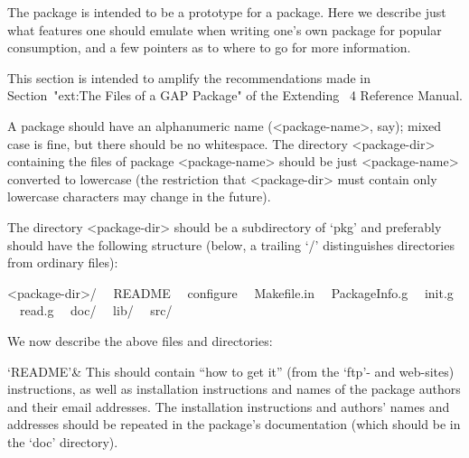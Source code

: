 

The {\Example} package is intended to be a prototype for a package.  Here
we describe just what features one should emulate when writing one's  own
{\GAP} package for popular consumption, and a few pointers as to where to
go for more information.


This  section  is  intended  to  amplify  the  recommendations  made   in
Section~"ext:The Files of  a  GAP  Package"  of  the  Extending  {\GAP}~4
Reference Manual.

A {\GAP} package should have an alphanumeric name (<package-name>,  say);
mixed case is fine, but there should  be  no  whitespace.  The  directory
<package-dir> containing the files of package  <package-name>  should  be
just  <package-name>  converted  to  lowercase  (the   restriction   that
<package-dir> must contain only lowercase characters may  change  in  the
future).

The directory  <package-dir>  should  be  a  subdirectory  of  `pkg'  and
preferably should have the following structure  (below,  a  trailing  `/'
distinguishes directories from ordinary files):

<package-dir>/
\ \ README
\ \ configure
\ \ Makefile.in
\ \ PackageInfo.g
\ \ init.g
\ \ read.g
\ \ doc/
\ \ lib/
\ \ src/

We now describe the above files and directories:

\beginitems

`README'&
This should contain ``how  to  get  it''  (from  the  {\GAP}  `ftp'-  and
web-sites) instructions, as well as installation instructions  and  names
of the package  authors  and  their  email  addresses.  The  installation
instructions and authors' names and addresses should be repeated  in  the
package's documentation (which should be in the `doc' directory).

